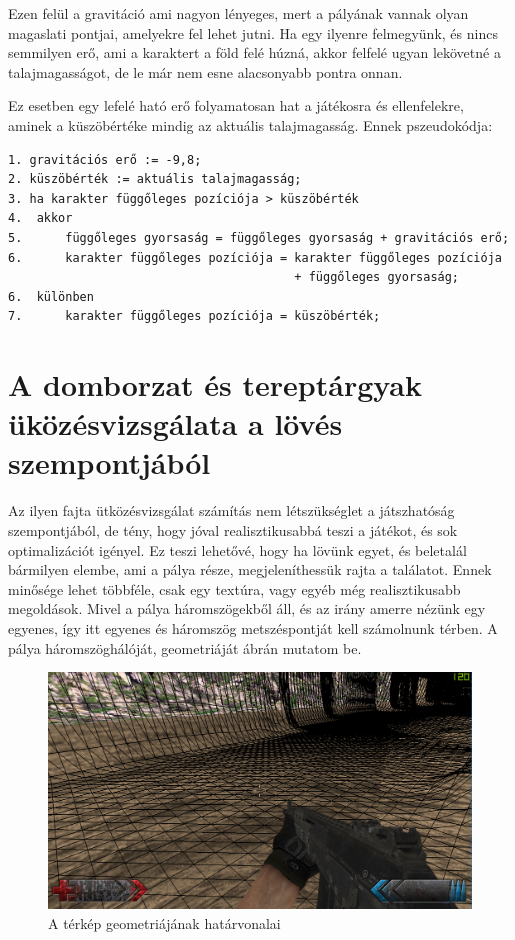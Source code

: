 Ezen felül a gravitáció ami nagyon lényeges, mert a pályának vannak olyan magaslati pontjai, amelyekre fel lehet jutni. Ha egy ilyenre felmegyünk, és nincs semmilyen erő, ami a karaktert a föld felé húzná, akkor felfelé ugyan lekövetné a talajmagasságot, de le már nem esne alacsonyabb pontra onnan.

 Ez esetben egy lefelé ható erő folyamatosan hat a játékosra és ellenfelekre, aminek a küszöbértéke mindig az aktuális talajmagasság. Ennek pszeudokódja:

\begin{verbatim}
1. gravitációs erő := -9,8;
2. küszöbérték := aktuális talajmagasság;
3. ha karakter függőleges pozíciója > küszöbérték
4. 	akkor
5.		függőleges gyorsaság = függőleges gyorsaság + gravitációs erő;
6.		karakter függőleges pozíciója = karakter függőleges pozíciója 
										+ függőleges gyorsaság;
6.	különben
7. 		karakter függőleges pozíciója = küszöbérték;
\end{verbatim}
 
\section{A domborzat és tereptárgyak üközésvizsgálata a lövés szempontjából}

Az ilyen fajta ütközésvizsgálat számítás nem létszükséglet a játszhatóság szempontjából, de tény, hogy jóval realisztikusabbá teszi a játékot, és sok optimalizációt igényel. Ez teszi lehetővé, hogy ha lövünk egyet, és beletalál bármilyen elembe, ami a pálya része, megjeleníthessük rajta a találatot. Ennek minősége lehet többféle, csak egy textúra, vagy egyéb még realisztikusabb megoldások. Mivel a pálya háromszögekből áll, és az irány amerre nézünk egy egyenes, így itt egyenes és háromszög metszéspontját kell számolnunk térben. A pálya háromszöghálóját, geometriáját  ábrán mutatom be.

\begin{figure}[h]
\centering
\includegraphics[scale=0.4]{kepek/map_wireframe.png}
\caption{A térkép geometriájának határvonalai}
\label{fig:wireframe}
\end{figure}

